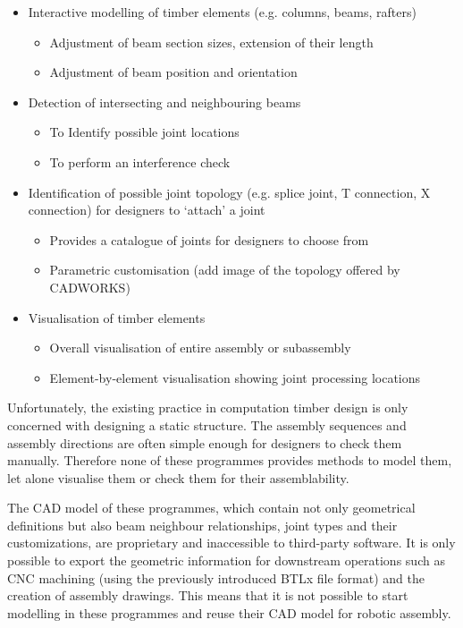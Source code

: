 \begin{itemize}[nosep]
    \item Interactive modelling of timber elements (e.g. columns, beams, rafters)
    \begin{itemize}
        \item Adjustment of beam section sizes, extension of their length
        \item Adjustment of beam position and orientation
    \end{itemize}
    \item Detection of intersecting and neighbouring beams
    \begin{itemize}
        \item To Identify possible joint locations
        \item To perform an interference check
    \end{itemize}
    \item Identification of possible joint topology (e.g. splice joint, T connection, X connection) for designers to `attach' a joint
    \begin{itemize}
        \item Provides a catalogue of joints for designers to choose from
        \item Parametric customisation (add image of the topology offered by CADWORKS)
    \end{itemize}
     \item Visualisation of timber elements
    \begin{itemize}
        \item Overall visualisation of entire assembly or subassembly
        \item Element-by-element visualisation showing joint processing locations
    \end{itemize}
\end{itemize}

Unfortunately, the existing practice in computation timber design is only concerned with designing a static structure. The assembly sequences and assembly directions are often simple enough for designers to check them manually. Therefore none of these programmes provides methods to model them, let alone visualise them or check them for their assemblability. 

The CAD model of these programmes, which contain not only geometrical definitions but also beam neighbour relationships, joint types and their customizations, are proprietary and inaccessible to third-party software. It is only possible to export the geometric information for downstream operations such as CNC machining (using the previously introduced BTLx file format) and the creation of assembly drawings. This means that it is not possible to start modelling in these programmes and reuse their CAD model for robotic assembly. 

